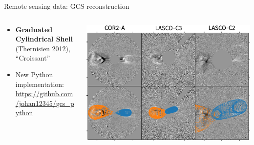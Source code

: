 \documentclass[10pt,aspectratio=169,usenames,dvipsnames]{beamer}
\begin{document}
\begin{frame}{Remote sensing data: GCS reconstruction}
    \begin{columns}
        \begin{column}{0.4\textwidth}
            \begin{itemize}
                \item \textbf{Graduated Cylindrical Shell} (Thernisien 2012), ``Croissant''
                \item New Python implementation:\\[-1mm] {\scriptsize\url{https://github.com/johan12345/gcs_python}}
            \end{itemize}
            \centering
            
        \end{column}
        \begin{column}{0.5\textwidth}
            \centering
            \includegraphics[width=\textwidth]{plots/gcs_reconstruction.pdf}
        \end{column}
    \end{columns}
\end{frame}
\end{document}
